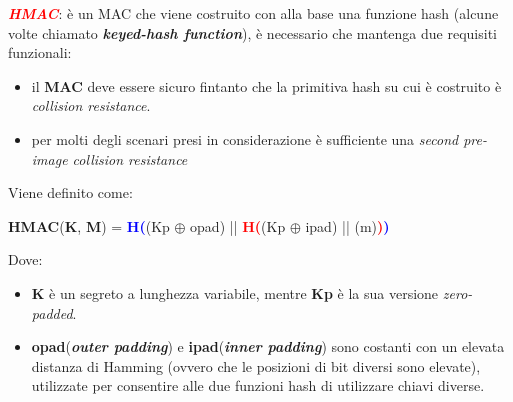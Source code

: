 \begin{flushleft}
    \textcolor{red}{\textbf{\textit{HMAC}}}: è un MAC che viene costruito con alla base una funzione hash (alcune volte chiamato \textbf{\textit{keyed-hash function}}), è necessario che mantenga due requisiti funzionali:
    \begin{itemize}[nosep]
        \item il \textbf{MAC} deve essere sicuro fintanto che la primitiva hash su cui è costruito è \textit{collision resistance}.
        \item per molti degli scenari presi in considerazione è sufficiente una \textit{second pre-image collision resistance}
    \end{itemize}
    Viene definito come:

    {\centering
        \textbf{HMAC}(\textbf{K}, \textbf{M}) = \textcolor{blue}{\textbf{H(}}(Kp $\oplus$ opad) || \textcolor{red}{\textbf{H(}}(Kp $\oplus$ ipad) || (m)\textcolor{red}{\textbf{)}}\textcolor{blue}{\textbf{)}}
    \par}
    Dove: 
    \begin{itemize}[nosep]
        \item \textbf{K} è un segreto a lunghezza variabile, mentre \textbf{Kp} è la sua versione \textit{zero-padded}.
        \item \textbf{opad}(\textbf{\textit{outer padding}}) e \textbf{ipad}(\textbf{\textit{inner padding}}) sono costanti con un elevata distanza di Hamming (ovvero che le posizioni di bit diversi sono elevate), utilizzate per consentire alle due funzioni hash di utilizzare chiavi diverse.
    \end{itemize}
\end{flushleft}

